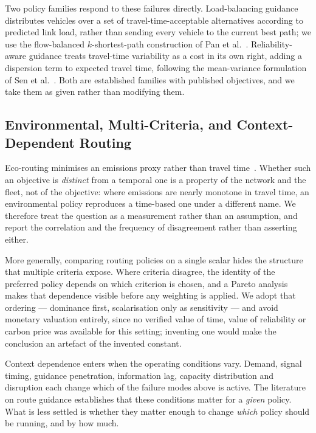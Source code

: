 Two policy families respond to these failures directly. Load-balancing guidance
distributes vehicles over a set of travel-time-acceptable alternatives
according to predicted link load, rather than sending every vehicle to the
current best path; we use the flow-balanced $k$-shortest-path construction of
Pan et al.~\cite{pan2013proactive}. Reliability-aware guidance treats
travel-time variability as a cost in its own right, adding a dispersion term to
expected travel time, following the mean-variance formulation of Sen et
al.~\cite{sen2001meanvariance}. Both are established families with published
objectives, and we take them as given rather than modifying them.

\subsection{Environmental, Multi-Criteria, and Context-Dependent Routing}

Eco-routing minimises an emissions proxy rather than travel
time~\cite{boriboonsomsin2012eco}. Whether such an objective is \emph{distinct}
from a temporal one is a property of the network and the fleet, not of the
objective: where emissions are nearly monotone in travel time, an
environmental policy reproduces a time-based one under a different name. We
therefore treat the question as a measurement rather than an assumption, and
report the correlation and the frequency of disagreement rather than asserting
either.

More generally, comparing routing policies on a single scalar hides the
structure that multiple criteria expose. Where criteria disagree, the identity
of the preferred policy depends on which criterion is chosen, and a Pareto
analysis makes that dependence visible before any weighting is applied. We
adopt that ordering --- dominance first, scalarisation only as sensitivity ---
and avoid monetary valuation entirely, since no verified value of time, value
of reliability or carbon price was available for this setting; inventing one
would make the conclusion an artefact of the invented constant.

Context dependence enters when the operating conditions vary. Demand, signal
timing, guidance penetration, information lag, capacity distribution and
disruption each change which of the failure modes above is active. The
literature on route guidance establishes that these conditions matter for a
\emph{given} policy. What is less settled is whether they matter enough to
change \emph{which} policy should be running, and by how much.

